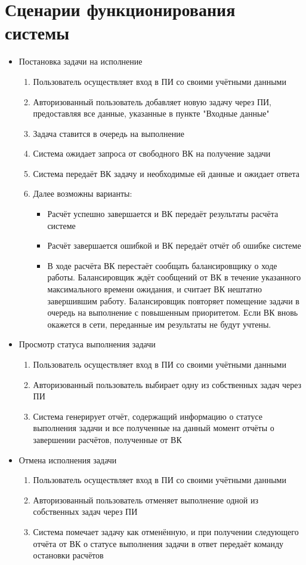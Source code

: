 \documentclass[a4paper,12pt]{report}
\numberwithin{equation}{section}
\begin{document}
\section{Сценарии функционирования системы}
\begin{itemize}
  \item Постановка задачи на исполнение
  \begin{enumerate}
    \item Пользователь осуществляет вход в ПИ со своими учётными данными
    \item Авторизованный пользователь добавляет новую задачу через ПИ, предоставляя все данные, указанные в пункте "Входные данные"
    \item Задача ставится в очередь на выполнение
    \item Система ожидает запроса от свободного ВК на получение задачи
    \item Система передаёт ВК задачу и необходимые ей данные и ожидает ответа
    \item Далее возможны варианты:
      \begin{itemize}
        \item Расчёт успешно завершается и ВК передаёт результаты расчёта системе
        \item Расчёт завершается ошибкой и ВК передаёт отчёт об ошибке системе
        \item В ходе расчёта ВК перестаёт сообщать балансировщику о ходе работы. Балансировщик ждёт сообщений от ВК в течение указанного максимального времени ожидания, и считает ВК нештатно завершившим работу. Балансировщик повторяет помещение задачи в очередь на выполнение с повышенным приоритетом. Если ВК вновь окажется в сети, переданные им результаты не будут учтены.
      \end{itemize}
  \end{enumerate}
    
  \item Просмотр статуса выполнения задачи
  \begin{enumerate}
    \item Пользователь осуществляет вход в ПИ со своими учётными данными
    \item Авторизованный пользователь выбирает одну из собственных задач через ПИ
    \item Система генерирует отчёт, содержащий информацию о статусе выполнения задачи и все полученные на данный момент отчёты о завершении расчётов, полученные от ВК
  \end{enumerate}
  
  \item Отмена исполнения задачи
  \begin{enumerate}
    \item Пользователь осуществляет вход в ПИ со своими учётными данными
    \item Авторизованный пользователь отменяет выполнение одной из собственных задач через ПИ
    \item Система помечает задачу как отменённую, и при получении следующего отчёта от ВК о статусе выполнения задачи в ответ передаёт команду остановки расчётов
  \end{enumerate}
\end{itemize}
\end{document}
